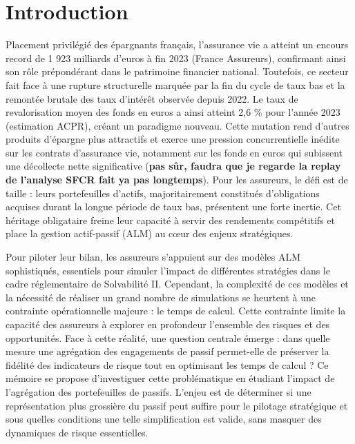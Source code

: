 \chapter*{Introduction}

Placement privilégié des épargnants français, l'assurance vie a atteint un encours record de 1 923 milliards d'euros à fin 2023 (France Assureurs), confirmant ainsi son rôle prépondérant dans le patrimoine financier national. Toutefois, ce secteur fait face à une rupture structurelle marquée par la fin du cycle de taux bas et la remontée brutale des taux d'intérêt observée depuis 2022. Le taux de revalorisation moyen des fonds en euros a ainsi atteint 2,6 \% pour l'année 2023 (estimation ACPR), créant un paradigme nouveau. Cette mutation rend d'autres produits d'épargne plus attractifs et exerce une pression concurrentielle inédite sur les contrats d'assurance vie, notamment sur les fonds en euros qui subissent une décollecte nette significative (\textbf{pas sûr, faudra que je regarde la replay de l'analyse SFCR fait ya pas longtemps}). Pour les assureurs, le défi est de taille : leurs portefeuilles d'actifs, majoritairement constitués d'obligations acquises durant la longue période de taux bas, présentent une forte inertie. Cet héritage obligataire freine leur capacité à servir des rendements compétitifs et place la gestion actif-passif (ALM) au cœur des enjeux stratégiques.

Pour piloter leur bilan, les assureurs s'appuient sur des modèles ALM sophistiqués, essentiels pour simuler l'impact de différentes stratégies dans le cadre réglementaire de Solvabilité II. Cependant, la complexité de ces modèles et la nécessité de réaliser un grand nombre de simulations se heurtent à une contrainte opérationnelle majeure : le temps de calcul. Cette contrainte limite la capacité des assureurs à explorer en profondeur l'ensemble des risques et des opportunités. Face à cette réalité, une question centrale émerge : dans quelle mesure une agrégation des engagements de passif permet-elle de préserver la fidélité des indicateurs de risque tout en optimisant les temps de calcul ? Ce mémoire se propose d'investiguer cette problématique en étudiant l'impact de l'agrégation des portefeuilles de passifs. L'enjeu est de déterminer si une représentation plus grossière du passif peut suffire pour le pilotage stratégique et sous quelles conditions une telle simplification est valide, sans masquer des dynamiques de risque essentielles.

